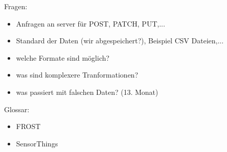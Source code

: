 \documentclass[12 pt]{article}
\begin{document}
Fragen:

\begin{itemize}
\item Anfragen an server für POST, PATCH, PUT,...
\item Standard der Daten (wir abgespeichert?), Beispiel CSV Dateien,...
\item welche Formate sind möglich?
\item was sind komplexere Tranformationen?
\item was passiert mit falschen Daten? (13. Monat)
\end{itemize}


Glossar:
\begin{itemize}
\item FROST
\item SensorThings
\end{itemize}
\end{document}
